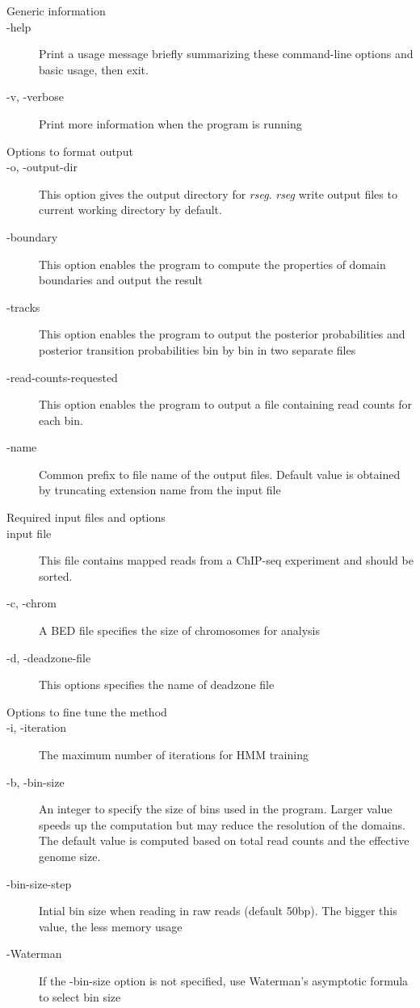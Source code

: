 \documentclass[11pt]{report}
\begin{document}
\begin{description}
\item[Generic information]
\item[-help] Print a usage message briefly summarizing these
  command-line options and basic usage, then exit.
\item[-v, -verbose] Print more information when the program is running
\item[Options to format output]
\item[-o, -output-dir] This option gives the output directory for
  \textit{rseg}. \textit{rseg} write output files to current working
  directory by default.
\item[-boundary] This option enables the program to compute the
  properties of domain boundaries and output the result
\item[-tracks] This option enables the program to output the
  posterior probabilities and posterior transition probabilities bin
  by bin in two separate files
\item[-read-counts-requested] This option enables the program to
  output a file containing read counts for each bin.  
\item[-name] Common prefix to file name of the output
  files. Default value is obtained by truncating extension name from
the input file
\item[Required input files and options]
\item[input file] This file contains mapped reads from a
  ChIP-seq experiment and should be sorted.
\item[-c, -chrom] A BED file specifies the size of chromosomes for
  analysis
\item[-d, -deadzone-file] This options specifies the name of deadzone
  file
\item[Options to fine tune the method]
\item[-i, -iteration] The maximum number of iterations for HMM
  training
\item[-b, -bin-size] An integer to specify the size of bins used in
  the program. Larger value speeds up the computation but may reduce
  the resolution of the domains. The default value is computed based
  on total read counts and the effective genome size.
\item[-bin-size-step] Intial bin size when reading in raw reads
  (default 50bp). The bigger this value, the less memory usage
\item[-Waterman] If the -bin-size option is not specified, use
  Waterman's asymptotic formula to select bin size

\end{description}
\end{document}
